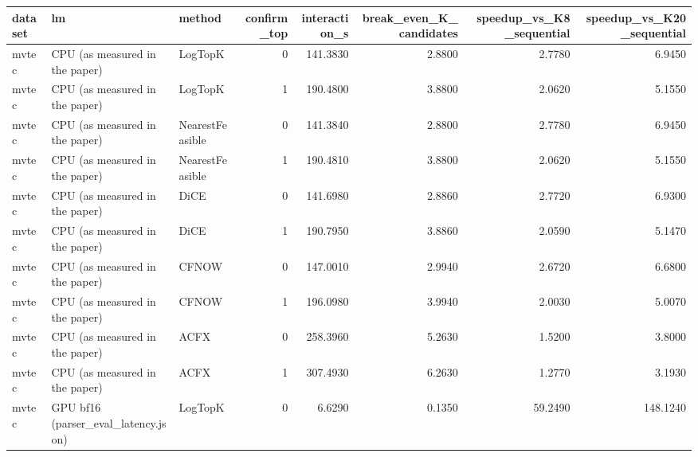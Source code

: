 \begin{tabular}{lllrrrrr}
\toprule
 dataset &                                  lm &          method &  confirm\_top &  interaction\_s &  break\_even\_K\_candidates &  speedup\_vs\_K8\_sequential &  speedup\_vs\_K20\_sequential \\
\midrule
   mvtec &      CPU (as measured in the paper) &         LogTopK &            0 &       141.3830 &                   2.8800 &                    2.7780 &                     6.9450 \\
   mvtec &      CPU (as measured in the paper) &         LogTopK &            1 &       190.4800 &                   3.8800 &                    2.0620 &                     5.1550 \\
   mvtec &      CPU (as measured in the paper) & NearestFeasible &            0 &       141.3840 &                   2.8800 &                    2.7780 &                     6.9450 \\
   mvtec &      CPU (as measured in the paper) & NearestFeasible &            1 &       190.4810 &                   3.8800 &                    2.0620 &                     5.1550 \\
   mvtec &      CPU (as measured in the paper) &            DiCE &            0 &       141.6980 &                   2.8860 &                    2.7720 &                     6.9300 \\
   mvtec &      CPU (as measured in the paper) &            DiCE &            1 &       190.7950 &                   3.8860 &                    2.0590 &                     5.1470 \\
   mvtec &      CPU (as measured in the paper) &           CFNOW &            0 &       147.0010 &                   2.9940 &                    2.6720 &                     6.6800 \\
   mvtec &      CPU (as measured in the paper) &           CFNOW &            1 &       196.0980 &                   3.9940 &                    2.0030 &                     5.0070 \\
   mvtec &      CPU (as measured in the paper) &            ACFX &            0 &       258.3960 &                   5.2630 &                    1.5200 &                     3.8000 \\
   mvtec &      CPU (as measured in the paper) &            ACFX &            1 &       307.4930 &                   6.2630 &                    1.2770 &                     3.1930 \\
   mvtec & GPU bf16 (parser\_eval\_latency.json) &         LogTopK &            0 &         6.6290 &                   0.1350 &                   59.2490 &                   148.1240 \\

\end{tabular}
